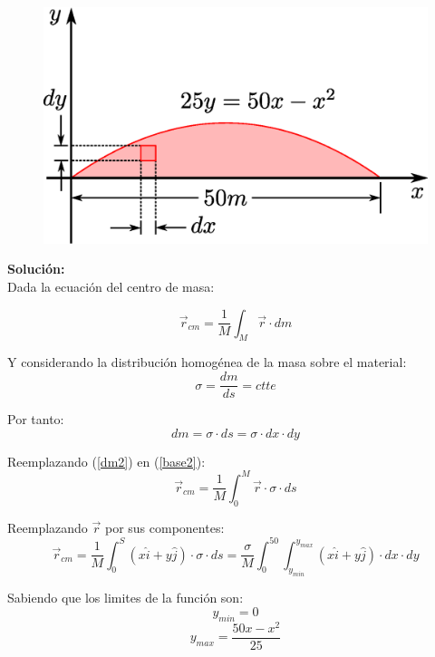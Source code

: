 \documentclass[letter,11pt]{article}
\begin{document}
\begin{figure}[!h]
\centering
\includegraphics[scale=0.42]{resources/f2.eps}
\end{figure}

\textbf{Solución:} \\

Dada la ecuación del centro de masa:

\begin{equation}
    \vec{r}_{cm} = \frac{1}{M} \int_{M} \vec{r} \cdot dm
\label{base2}
\end{equation}

Y considerando la distribución homogénea de la masa sobre el material:
\begin{equation*}
    \sigma = \frac{dm}{ds} = ctte
\end{equation*}

Por tanto:
\begin{equation}
    dm = \sigma \cdot ds = \sigma \cdot dx \cdot dy
\label{dm2}
\end{equation}

Reemplazando (\ref{dm2}) en (\ref{base2}):
\begin{equation*}
    \vec{r}_{cm} = \frac{1}{M} \int_{0}^{M} \vec{r} \cdot \sigma \cdot ds
\end{equation*}

Reemplazando $\vec{r}$ por sus componentes:
\begin{equation*}
    \vec{r}_{cm} = \frac{1}{M} \int_{0}^{S} (x \hat{i} + y \hat{j}) \cdot \sigma \cdot ds = \frac{\sigma}{M} \int_{0}^{50} \int_{y_{min}}^{y_{max}} (x \hat{i} + y \hat{j}) \cdot dx \cdot dy
\end{equation*}

Sabiendo que los limites de la función son:
\begin{equation*}
    y_{min} = 0
\end{equation*}
\begin{equation*}
    y_{max} = \frac{50x - x^2}{25}
\end{equation*}
\end{document}
